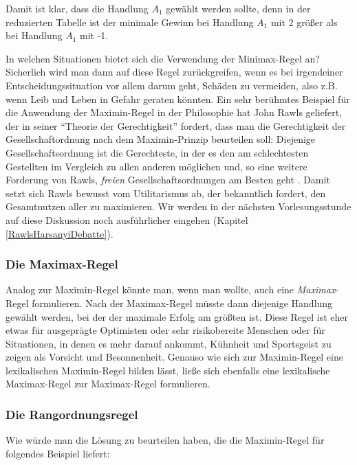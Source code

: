 Damit ist klar, dass die Handlung $A_1$ gewählt werden sollte, denn in der
reduzierten Tabelle ist der minimale Gewinn bei Handlung $A_1$ mit 2 größer als
bei Handlung $A_1$ mit -1.

In welchen Situationen bietet sich die Verwendung der Minimax-Regel an?
Sicherlich wird man dann auf diese Regel zurückgreifen, wenn es bei irgendeiner
Entscheidungssituation vor allem darum geht, Schäden zu vermeiden, also z.B. wenn
Leib und Leben in Gefahr geraten könnten.
 Ein sehr berühmtes Beispiel für
die Anwendung der Maximin-Regel in der Philosophie hat John Rawls geliefert, der
in seiner "`Theorie der Gerechtigkeit"' fordert, dass man die Gerechtigkeit der
Gesellschaftordnung nach dem Maximin-Prinzip beurteilen soll: Diejenige
Gesellschaftsordnung ist die Gerechteste, in der es den am schlechtesten
Gestellten im Vergleich zu allen anderen möglichen und, so eine weitere
Forderung von Rawls, {\em freien} Gesellschaftsordnungen am Besten geht
\cite[S. 96ff.]{rawls:1971}. Damit setzt sich Rawls bewusst vom Utilitarismus ab, der
bekanntlich fordert, den Gesamtnutzen aller zu maximieren. Wir werden in der
nächsten Vorlesungsstunde auf diese Diskussion noch ausführlicher eingehen
(Kapitel \ref{RawlsHarsanyiDebatte}).

\subsubsection{Die Maximax-Regel}

Analog zur Maximin-Regel könnte man, wenn man wollte, auch eine {\em
Max\-imax}-\-Regel formulieren. Nach der Maximax-Regel müsste dann diejenige
Handlung gewählt werden, bei der der maximale Erfolg am größten ist. Diese Regel
ist eher etwas für ausgeprägte Optimisten oder sehr risikobereite Menschen oder
für Situationen, in denen es mehr darauf ankommt, Kühnheit und Sportsgeist zu
zeigen als Vorsicht und Besonnenheit. Genauso wie sich zur
Maximin-Regel eine lexikalischen Maximin-Regel bilden lässt, ließe sich
ebenfalls eine lexikalische Maximax-Regel zur Maximax-Regel formulieren.
 
\subsubsection{Die Rangordnungsregel}
\label{Rangordnungsregel}

Wie würde man die Lösung zu beurteilen haben, die die Maximin-Regel für
folgendes Beispiel liefert:

